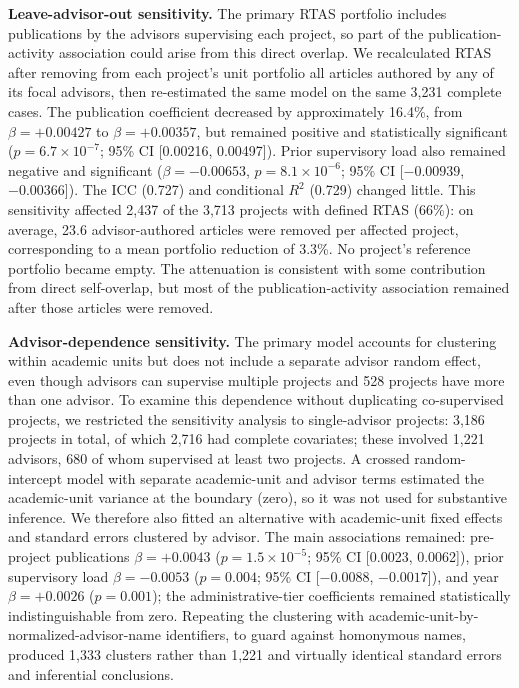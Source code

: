 \documentclass[pdflatex,sn-apa]{sn-jnl}
\begin{document}
\textbf{Leave-advisor-out sensitivity.} The primary RTAS portfolio includes publications by the advisors supervising each project, so part of the publication-activity association could arise from this direct overlap. We recalculated RTAS after removing from each project's unit portfolio all articles authored by any of its focal advisors, then re-estimated the same model on the same 3,231 complete cases. The publication coefficient decreased by approximately 16.4\%, from $\beta=+0.00427$ to $\beta=+0.00357$, but remained positive and statistically significant ($p=6.7\times10^{-7}$; 95\% CI [0.00216, 0.00497]). Prior supervisory load also remained negative and significant ($\beta=-0.00653$, $p=8.1\times10^{-6}$; 95\% CI [$-0.00939$, $-0.00366$]). The ICC (0.727) and conditional $R^2$ (0.729) changed little. This sensitivity affected 2,437 of the 3,713 projects with defined RTAS (66\%): on average, 23.6 advisor-authored articles were removed per affected project, corresponding to a mean portfolio reduction of 3.3\%. No project's reference portfolio became empty. The attenuation is consistent with some contribution from direct self-overlap, but most of the publication-activity association remained after those articles were removed.

\textbf{Advisor-dependence sensitivity.} The primary model accounts for clustering within academic units but does not include a separate advisor random effect, even though advisors can supervise multiple projects and 528 projects have more than one advisor. To examine this dependence without duplicating co-supervised projects, we restricted the sensitivity analysis to single-advisor projects: 3,186 projects in total, of which 2,716 had complete covariates; these involved 1,221 advisors, 680 of whom supervised at least two projects. A crossed random-intercept model with separate academic-unit and advisor terms estimated the academic-unit variance at the boundary (zero), so it was not used for substantive inference. We therefore also fitted an alternative with academic-unit fixed effects and standard errors clustered by advisor. The main associations remained: pre-project publications $\beta=+0.0043$ ($p=1.5\times10^{-5}$; 95\% CI [0.0023, 0.0062]), prior supervisory load $\beta=-0.0053$ ($p=0.004$; 95\% CI [$-0.0088$, $-0.0017$]), and year $\beta=+0.0026$ ($p=0.001$); the administrative-tier coefficients remained statistically indistinguishable from zero. Repeating the clustering with academic-unit-by-normalized-advisor-name identifiers, to guard against homonymous names, produced 1,333 clusters rather than 1,221 and virtually identical standard errors and inferential conclusions.
\end{document}
